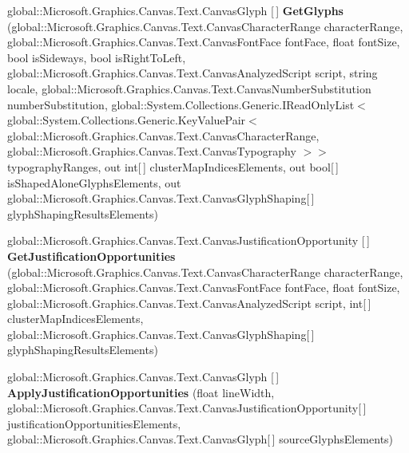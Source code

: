 \begin{DoxyCompactItemize}
global\+::\+Microsoft.\+Graphics.\+Canvas.\+Text.\+Canvas\+Glyph \mbox{[}$\,$\mbox{]} {\bfseries Get\+Glyphs} (global\+::\+Microsoft.\+Graphics.\+Canvas.\+Text.\+Canvas\+Character\+Range character\+Range, global\+::\+Microsoft.\+Graphics.\+Canvas.\+Text.\+Canvas\+Font\+Face font\+Face, float font\+Size, bool is\+Sideways, bool is\+Right\+To\+Left, global\+::\+Microsoft.\+Graphics.\+Canvas.\+Text.\+Canvas\+Analyzed\+Script script, string locale, global\+::\+Microsoft.\+Graphics.\+Canvas.\+Text.\+Canvas\+Number\+Substitution number\+Substitution, global\+::\+System.\+Collections.\+Generic.\+I\+Read\+Only\+List$<$ global\+::\+System.\+Collections.\+Generic.\+Key\+Value\+Pair$<$ global\+::\+Microsoft.\+Graphics.\+Canvas.\+Text.\+Canvas\+Character\+Range, global\+::\+Microsoft.\+Graphics.\+Canvas.\+Text.\+Canvas\+Typography $>$$>$ typography\+Ranges, out int\mbox{[}$\,$\mbox{]} cluster\+Map\+Indices\+Elements, out bool\mbox{[}$\,$\mbox{]} is\+Shaped\+Alone\+Glyphs\+Elements, out global\+::\+Microsoft.\+Graphics.\+Canvas.\+Text.\+Canvas\+Glyph\+Shaping\mbox{[}$\,$\mbox{]} glyph\+Shaping\+Results\+Elements)
\item 
\mbox{\label{class_microsoft_1_1_graphics_1_1_canvas_1_1_text_1_1_canvas_text_analyzer_ab8294f1044be5a3f03e8601c5a48811a}} 
global\+::\+Microsoft.\+Graphics.\+Canvas.\+Text.\+Canvas\+Justification\+Opportunity \mbox{[}$\,$\mbox{]} {\bfseries Get\+Justification\+Opportunities} (global\+::\+Microsoft.\+Graphics.\+Canvas.\+Text.\+Canvas\+Character\+Range character\+Range, global\+::\+Microsoft.\+Graphics.\+Canvas.\+Text.\+Canvas\+Font\+Face font\+Face, float font\+Size, global\+::\+Microsoft.\+Graphics.\+Canvas.\+Text.\+Canvas\+Analyzed\+Script script, int\mbox{[}$\,$\mbox{]} cluster\+Map\+Indices\+Elements, global\+::\+Microsoft.\+Graphics.\+Canvas.\+Text.\+Canvas\+Glyph\+Shaping\mbox{[}$\,$\mbox{]} glyph\+Shaping\+Results\+Elements)
\item 
\mbox{\label{class_microsoft_1_1_graphics_1_1_canvas_1_1_text_1_1_canvas_text_analyzer_a46e9ecbf797abc6031411602e6c4d80e}} 
global\+::\+Microsoft.\+Graphics.\+Canvas.\+Text.\+Canvas\+Glyph \mbox{[}$\,$\mbox{]} {\bfseries Apply\+Justification\+Opportunities} (float line\+Width, global\+::\+Microsoft.\+Graphics.\+Canvas.\+Text.\+Canvas\+Justification\+Opportunity\mbox{[}$\,$\mbox{]} justification\+Opportunities\+Elements, global\+::\+Microsoft.\+Graphics.\+Canvas.\+Text.\+Canvas\+Glyph\mbox{[}$\,$\mbox{]} source\+Glyphs\+Elements)
$$
\end{DoxyCompactItemize}
